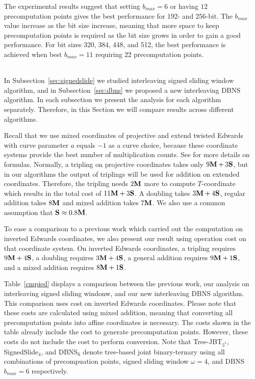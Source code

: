 The experimental results suggest that setting $b_{max} = 6$ or having $12$ precomputation points gives the best performance for 192- and 256-bit.
The $b_{max}$ value increase as the bit size increase, meaning that more space to keep precomputation points is required as the bit size grows
in order to gain a good performance.
For bit sizes 320, 384, 448, and 512, the best performance is achieved when  best $b_{max} = 11$ requiring $22$ precomputation points.



 \\

In Subsection~\ref{sec:signedslide} we studied interleaving signed sliding window algorithm,
and in Subsection~\ref{sec:dbns} we proposed a new interleaving DBNS algorithm.
In each subsection we present the analysis for each algorithm separately.
Therefore, in this Section we will compare results across different algorithms.

Recall that we use mixed coordinates of projective and extend twisted Edwards with curve parameter $a$ equals $-1$ as a curve choice,
because these coordinate systems provide the best number of multiplication counts.
See \cite{EFD} for more details on formulas.
Normally, a tripling on projective coordinates takes only $9\text{\bf M} + 3\text{\bf S}$,
but in our algorithms the output of triplings will be used for addition on extended coordinates.
Therefore, the tripling needs $2\text{\bf M}$ more to compute $T$-coordinate which results in the total cost of $11\text{\bf M} + 3\text{\bf S}$.
A doubling takes $3\text{\bf M} + 4\text{\bf S}$, regular addition takes $8\text{\bf M}$ and mixed addition takes $7\text{\bf M}$.
We also use a common assumption that $\text{\bf S} \approx 0.8\text{\bf M}$.

To ease a comparison to a previous work \cite{DKS09} which carried out the computation on inverted Edwards coordinates,
we also present our result using operation cost on that coordinate system.
On inverted Edwards coordinates, a tripling requires $9\text{\bf M} + 4\text{\bf S}$, a doubling requires $3\text{\bf M} + 4\text{\bf S}$, a general addition requires $9\text{\bf M} + 1\text{\bf S}$,
and a mixed addition requires $8\text{\bf M} + 1\text{\bf S}$.

Table~\ref{cmpied} displays a comparison between the previous work\cite{DKS09},
our analysis on interleaving signed sliding windonw,
and our new interleaving DBNS algorithm.
This comparison uses cost on inverted Edwards coordinates.
Please note that these costs are calculated using mixed addition, meaning that converting all precomputation points into affine coordinates is necessary.
The costs shown in the table already include the cost to generate precomputation points.
However, these costs do not include the cost to perform conversion.
Note that Tree-JBT$_{5^2}$, SignedSlide$_4$, and DBNS$_6$ denote tree-based joint binary-ternary using all combinations of precompuation points,
signed sliding window $\omega = 4$, and DBNS $b_{max} = 6$ respectively.

